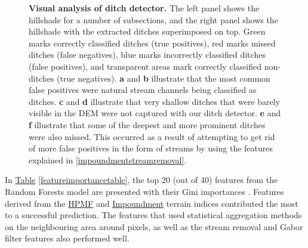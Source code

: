 \documentclass[11pt, review]{elsarticle} %
\begin{document}
\begin{figure} [!htb]
    \newline
    \caption{\textbf{Visual analysis of ditch detector.} The left panel shows the hillshade for a number of subsections, and the right panel shows the hillshade with the extracted ditches superimposed on top. Green marks correctly classified ditches (true positives), red marks missed ditches (false negatives), blue marks incorrectly classified ditches (false positives), and transparent areas mark correctly classified non-ditches (true negatives). \textbf{a} and \textbf{b} illustrate that the most common false positives were natural stream channels being classified as ditches. \textbf{c} and \textbf{d} illustrate that very shallow ditches that were barely visible in the DEM were not captured with our ditch detector. \textbf{e} and \textbf{f} illustrate that some of the deepest and more prominent ditches were also missed. This occurred as a result of attempting to get rid of more false positives in the form of streams by using the features explained in \ref{impoundmentstreamremoval}.}
    \label{fig:resultsillustrations}
\end{figure}

In \hyperref[featureimportancetable]{Table} \ref{featureimportancetable}, the top 20 (out of 40) features from the Random Forests model are presented with their Gini importances \citep{gini}. Features derived from the \hyperref[hpmf]{HPMF} and \hyperref[impoundment]{Impoundment} terrain indices contributed the most to a successful prediction. The features that used statistical aggregation methods on the neighbouring area around pixels, as well as the stream removal and Gabor filter features also performed well.
\end{document}
